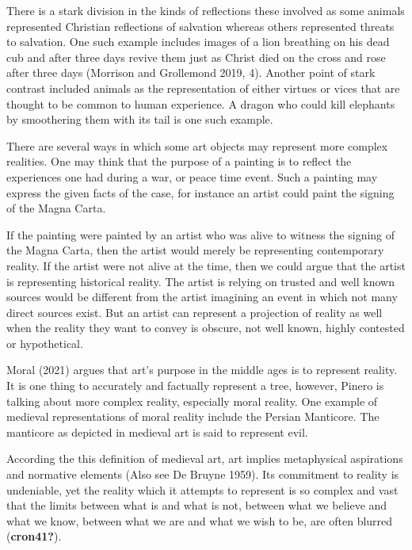 \documentclass[
  letterpaper,
  DIV=11,
  numbers=noendperiod]{scrreprt}
\begin{document}
\begin{tcolorbox}[enhanced jigsaw, arc=.35mm, breakable, rightrule=.15mm, colback=white, colframe=quarto-callout-important-color-frame, bottomrule=.15mm, leftrule=.75mm, opacityback=0, toprule=.15mm, left=2mm]
\begin{tcolorbox}[enhanced jigsaw, arc=.35mm, breakable, rightrule=.15mm, colback=white, colframe=quarto-callout-tip-color-frame, bottomrule=.15mm, leftrule=.75mm, opacityback=0, toprule=.15mm, left=2mm]
There is a stark division in the kinds of reflections these involved as
some animals represented Christian reflections of salvation whereas
others represented threats to salvation. One such example includes
images of a lion breathing on his dead cub and after three days revive
them just as Christ died on the cross and rose after three days
(Morrison and Grollemond 2019, 4). Another point of stark contrast
included animals as the representation of either virtues or vices that
are thought to be common to human experience. A dragon who could kill
elephants by smoothering them with its tail is one such example.

There are several ways in which some art objects may represent more
complex realities. One may think that the purpose of a painting is to
reflect the experiences one had during a war, or peace time event. Such
a painting may express the given facts of the case, for instance an
artist could paint the signing of the Magna Carta.

If the painting were painted by an artist who was alive to witness the
signing of the Magna Carta, then the artist would merely be representing
contemporary reality. If the artist were not alive at the time, then we
could argue that the artist is representing historical reality. The
artist is relying on trusted and well known sources would be different
from the artist imagining an event in which not many direct sources
exist. But an artist can represent a projection of reality as well when
the reality they want to convey is obscure, not well known, highly
contested or hypothetical.

Moral (2021) argues that art's purpose in the middle ages is to
represent reality. It is one thing to accurately and factually represent
a tree, however, Pinero is talking about more complex reality,
especially moral reality. One example of medieval representations of
moral reality include the Persian Manticore. The manticore as depicted
in medieval art is said to represent evil.

According the this definition of medieval art, art implies metaphysical
aspirations and normative elements (Also see De Bruyne 1959). Its
commitment to reality is undeniable, yet the reality which it attempts
to represent is so complex and vast that the limits between what is and
what is not, between what we believe and what we know, between what we
are and what we wish to be, are often blurred (\textbf{cron41?}).


\end{tcolorbox}
\end{tcolorbox}
\end{document}
